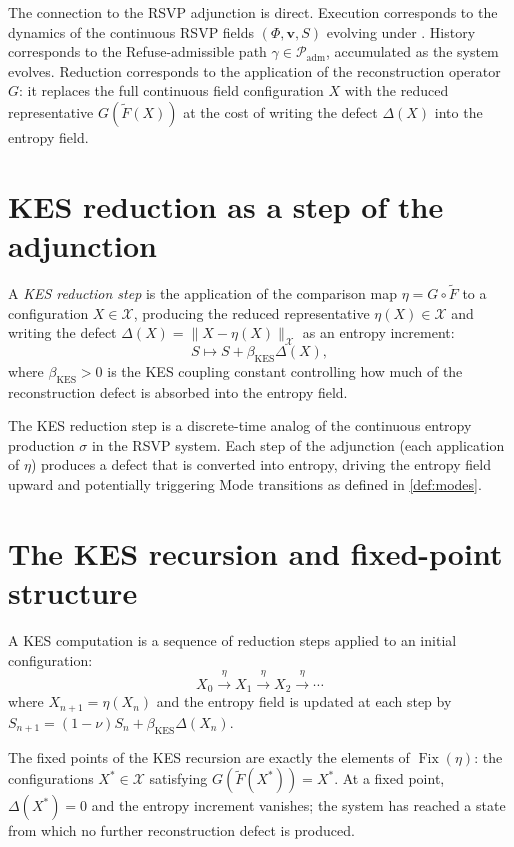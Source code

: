 \documentclass[12pt, oneside]{memoir}
\DeclareMathOperator{\Fix}{Fix}
\newcommand{\X}{\mathcal{X}}
\newcommand{\Ft}{\widetilde{F}}
\newcommand{\Padm}{\mathcal{P}_{\mathrm{adm}}}
\newcommand{\nnorm}[1]{\lVert #1 \rVert}
\newcommand{\bv}{\mathbf{v}}
\begin{document}
The connection to the RSVP adjunction is direct.  Execution corresponds to the dynamics
of the continuous RSVP fields $(\Phi, \bv, S)$ evolving under .
History corresponds to the Refuse-admissible path $\gamma \in \Padm$, accumulated as the
system evolves.  Reduction corresponds to the application of the reconstruction operator
$G$: it replaces the full continuous field configuration $X$ with the reduced
representative $G(\Ft(X))$ at the cost of writing the defect $\Delta(X)$ into the
entropy field.

\section{KES reduction as a step of the adjunction}

\begin{definition}
\label{def:kes-step}
A \emph{KES reduction step} is the application of the comparison map $\eta = G \circ
\Ft$ to a configuration $X \in \X$, producing the reduced representative $\eta(X) \in
\X$ and writing the defect $\Delta(X) = \nnorm{X - \eta(X)}_\X$ as an entropy increment:
\[
  S \mapsto S + \beta_{\mathrm{KES}} \Delta(X),
\]
where $\beta_{\mathrm{KES}} > 0$ is the KES coupling constant controlling how much of
the reconstruction defect is absorbed into the entropy field.
\end{definition}

The KES reduction step is a discrete-time analog of the continuous entropy production
$\sigma$ in the RSVP system.  Each step of the adjunction (each application of $\eta$)
produces a defect that is converted into entropy, driving the entropy field upward and
potentially triggering Mode transitions as defined in \cref{def:modes}.

\section{The KES recursion and fixed-point structure}

A KES computation is a sequence of reduction steps applied to an initial configuration:
\[
  X_0 \xrightarrow{\eta} X_1 \xrightarrow{\eta} X_2 \xrightarrow{\eta} \cdots
\]
where $X_{n+1} = \eta(X_n)$ and the entropy field is updated at each step by
$S_{n+1} = (1-\nu) S_n + \beta_{\mathrm{KES}} \Delta(X_n)$.

\begin{proposition}
\label{prop:kes-fixed}
The fixed points of the KES recursion are exactly the elements of $\Fix(\eta)$: the
configurations $X^* \in \X$ satisfying $G(\Ft(X^*)) = X^*$.  At a fixed point,
$\Delta(X^*) = 0$ and the entropy increment vanishes; the system has reached a state
from which no further reconstruction defect is produced.
\end{proposition}
\end{document}
